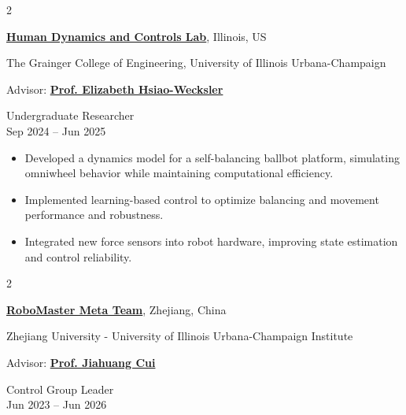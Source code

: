 \documentclass[10pt, letterpaper]{article}
\newenvironment{highlights}{
    \begin{itemize}[
        topsep=0.10 cm,
        parsep=0.10 cm,
        partopsep=0pt,
        itemsep=0pt,
        leftmargin=0 cm + 10pt
    ]
}{
    \end{itemize}
} %
\newenvironment{twocolentry}[2][]{
    \onecolentry
    \def\secondColumn{#2}
    \setcolumnwidth{\fill, 4.5 cm}
    \begin{paracol}{2}
}{
    \switchcolumn \raggedleft \secondColumn
    \end{paracol}
    \endonecolentry
} %
\begin{document}
        \vspace{0.3 cm}

        \begin{twocolentry} {
            Undergraduate Researcher \\
            Sep 2024 -- Jun 2025
        }
            \href{https://hdcl.mechanical.illinois.edu}{\textbf{Human Dynamics and Controls Lab}}, Illinois, US

            \vspace{0.05 cm}
            
            The Grainger College of Engineering, University of Illinois Urbana-Champaign

            \vspace{0.05 cm}

            Advisor: \href{https://bioengineering.illinois.edu/people/ethw}{\textbf{Prof. Elizabeth Hsiao-Wecksler}}

        \end{twocolentry}

        \vspace{0.10 cm}

        \begin{highlights}
            \item Developed a dynamics model for a self-balancing ballbot platform, simulating omniwheel behavior while maintaining computational efficiency.
            \item Implemented learning-based control to optimize balancing and movement performance and robustness.
            \item Integrated new force sensors into robot hardware, improving state estimation and control reliability.
        \end{highlights}
        
        \vspace{0.3 cm}

        \begin{twocolentry}{
            Control Group Leader \\
            Jun 2023 -- Jun 2026
        }
            \href{https://github.com/Meta-Team}{\textbf{RoboMaster Meta Team}}, Zhejiang, China
            
            \vspace{0.05 cm}
            
            Zhejiang University - University of Illinois Urbana-Champaign Institute

            \vspace{0.05 cm}

            Advisor: \href{https://mechse.illinois.edu/people/profile/zjui-cui}{\textbf{Prof. Jiahuang Cui}}
            
        \end{twocolentry}
\end{document}
